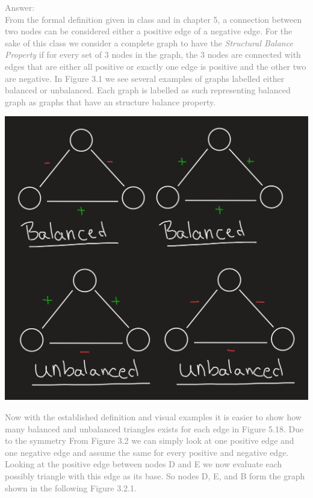 \documentclass[11pt]{article}
\begin{document}
\begin{enumerate}
\textcolor{gray}{
Answer:\\
From the formal definition given in class and in chapter 5, a connection between two nodes can be considered either a positive edge of a negative edge.  For the sake of this class we consider a complete graph to have the \textit{Structural Balance Property} if for every set of 3 nodes in the graph, the 3 nodes are connected with edges that are either all positive or exactly one edge is positive and the other two are negative. In Figure 3.1 we see several examples of graphs labelled either balanced or unbalanced.  Each graph is labelled as such representing balanced graph as graphs that have an structure balance property.\\
\begin{center}
	\includegraphics[scale=0.5]{example_ballanced_and_not_ballanced_graph}\\
\end{center}
Now with the established definition and visual examples it is easier to show how many balanced and unbalanced triangles exists for each edge in Figure 5.18. Due to the symmetry From Figure 3.2 we can simply look at one positive edge and one negative edge and assume the same for every positive and negative edge. Looking at the positive edge between nodes D and E we now evaluate each possibly triangle with this edge as its base.  So nodes D, E, and B  form the graph shown in the following Figure 3.2.1.\\
}
\end{enumerate}
\end{document}
